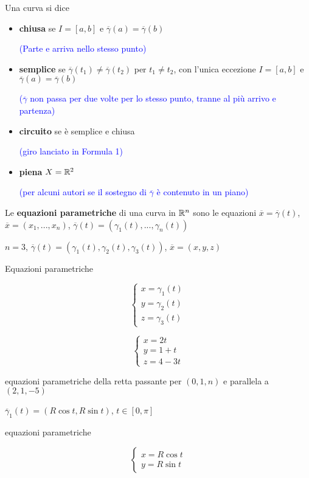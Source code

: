 Una curva si dice
\begin{itemize}
	\item \textbf{chiusa} se $I = [a,b]$ e $\overline{\gamma}(a)=\overline{\gamma}(b)$
	
	\textcolor{blue}{(Parte e arriva nello stesso punto)}
	
	\item \textbf{semplice} se $\overline{\gamma}(t_1)\neq \overline{\gamma}(t_2)$ per $t_1 \neq t_2$, con l'unica eccezione $I =[a,b]$ e $\overline{\gamma}(a)=\overline{\gamma}(b)$ 
	
	\textcolor{blue}{($\overline{\gamma}$ non passa per due volte per lo stesso punto, tranne al più arrivo e partenza)}
	
	\segnaposto %
	
	\item \textbf{circuito} se è semplice e chiusa 
	
	\textcolor{blue}{(giro lanciato in Formula 1)}
	
	\item \textbf{piena} $X =\mathbb{R}^2$ 
	
	\textcolor{blue}{(per alcuni autori se il sostegno di $\overline{\gamma}$ è contenuto in un piano)}
\end{itemize}


Le \textbf{equazioni parametriche} di una curva in $\mathbb{R}^n$ sono le equazioni $\overline{x}=\overline{\gamma}(t)$, $\overline{x}=(x_1,...,x_n)$, $\overline{\gamma}(t)=(\gamma_1(t),...,\gamma_n(t))$

$n=3$, $\overline{\gamma}(t)=(\gamma_1(t),\gamma_2(t),\gamma_3 (t))$, $\overline{x}=(x,y,z)$

Equazioni parametriche

$$\begin{cases}
	x=\gamma_1(t)\\
	y=\gamma_2(t)\\
	z=\gamma_3(t)
\end{cases}$$

\begin{exbar}
	$$\begin{cases}
		x=2t\\
		y=1+t\\
		z=4-3t
	\end{cases}$$
	
	equazioni parametriche della retta passante per $(0,1,n)$ e parallela a $(2,1,-5)$
	
	$\overline{\gamma}_1(t)=(R\cos t, R \sin t)$, $t \in [0,\pi]$ 
	
	equazioni parametriche 
	
	$$\begin{cases}
		x=R \cos t\\
		y=R \sin t
	\end{cases}$$
\end{exbar}


